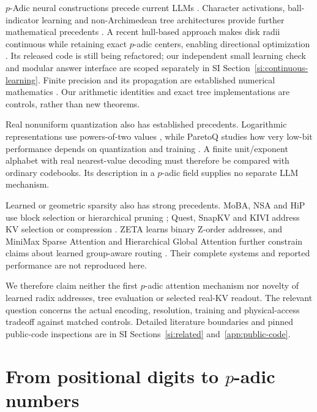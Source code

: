 \documentclass[11pt]{article}
\begin{document}
\(p\)-Adic neural constructions precede current LLMs
\citep{albeverio1999networks,baker2022pluralisation,martins2025learning}.
Character activations, ball-indicator learning and non-Archimedean tree
architectures provide further mathematical precedents
\citep{mihara2026character,nguessan2025vpunn,zuniga2026deep}.
A recent hull-based approach makes disk radii continuous while retaining exact
\(p\)-adic centers, enabling directional optimization
\citep{salazar2026continuous}. Its released code is still being refactored;
our independent small learning check and modular answer interface are scoped
separately in SI Section~\ref{si:continuous-learning}.
Finite precision and its propagation are established numerical mathematics
\citep{caruso2017computations}. Our arithmetic identities and exact tree
implementations are controls, rather than new theorems.

Real nonuniform quantization also has established precedents. Logarithmic
representations use powers-of-two values \citep{miyashita2016log}, while
ParetoQ studies how very low-bit performance depends on quantization and
training \citep{liu2025paretoq}. A finite unit/exponent alphabet with real
nearest-value decoding must therefore be compared with ordinary codebooks.
Its description in a \(p\)-adic field supplies no separate LLM mechanism.

Learned or geometric sparsity also has strong precedents. MoBA, NSA and HiP
use block selection or hierarchical pruning \citep{lu2025moba,yuan2025nsa,lee2025hip};
Quest, SnapKV and KIVI address KV selection or compression
\citep{tang2024quest,li2024snapkv,liu2024kivi}. ZETA learns binary Z-order
addresses, and MiniMax Sparse Attention and Hierarchical Global Attention
further constrain claims about learned group-aware routing
\citep{zeng2025zeta,lai2026msa,hga2026routing}.
Their complete systems and reported performance are not reproduced here.

We therefore claim neither the first \(p\)-adic attention mechanism nor novelty
of learned radix addresses, tree evaluation or selected real-KV readout.
The relevant question concerns the actual encoding, resolution, training
and physical-access tradeoff against matched controls. Detailed literature
boundaries and pinned public-code inspections are in SI
Sections~\ref{si:related} and~\ref{app:public-code}.

\section{From positional digits to \texorpdfstring{\(p\)}{p}-adic numbers}
\label{sec:theory}
\end{document}
